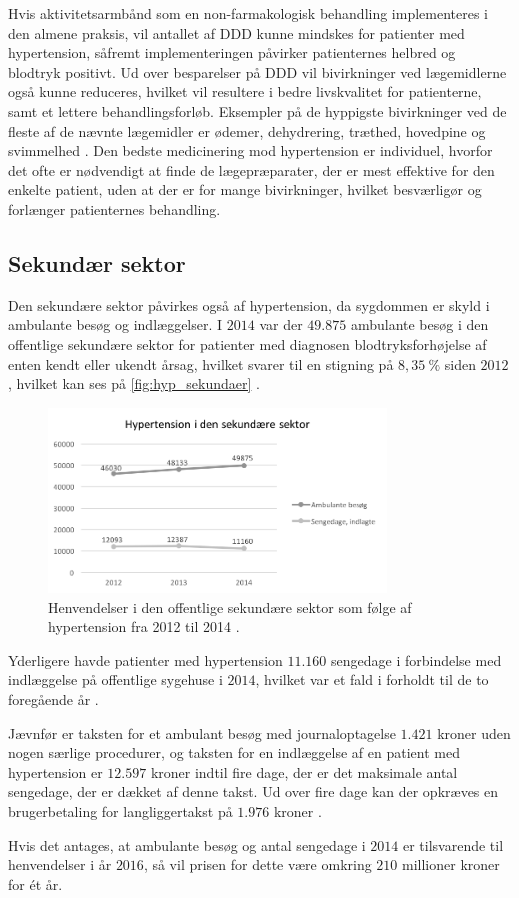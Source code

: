 Hvis aktivitetsarmbånd som en non-farmakologisk  behandling implementeres i den almene praksis, vil antallet af DDD kunne mindskes for patienter med hypertension, såfremt implementeringen påvirker patienternes helbred og blodtryk positivt. Ud over besparelser på DDD vil bivirkninger ved lægemidlerne også kunne reduceres, hvilket vil resultere i bedre livskvalitet for patienterne, samt et lettere behandlingsforløb. Eksempler på de hyppigste bivirkninger ved de fleste af de nævnte lægemidler er ødemer, dehydrering, træthed, hovedpine og svimmelhed \citep{olsen2015}. Den bedste medicinering mod hypertension er individuel, hvorfor det ofte er nødvendigt at finde de lægepræparater, der er mest effektive for den enkelte patient, uden at der er for mange bivirkninger, hvilket besværligør og forlænger patienternes behandling.

\subsection{Sekundær sektor}
Den sekundære sektor påvirkes også af hypertension, da sygdommen er skyld i ambulante besøg og indlæggelser. I $2014$ var der $49.875$ ambulante besøg i den offentlige sekundære sektor for patienter med diagnosen blodtryksforhøjelse af enten kendt eller ukendt årsag, hvilket svarer til en stigning på $8,35~\%$ siden $2012$, hvilket kan ses på \autoref{fig:hyp_sekundaer} \citep{sundhedsdatastyrelsen2016}. 

\begin{figure}[H]
\centering
\includegraphics[width=0.8\textwidth]{figures/hyp_sekundaer}
\caption{Henvendelser i den offentlige sekundære sektor som følge af hypertension fra 2012 til 2014 \citep{sundhedsdatastyrelsen2016}.}
\label{fig:hyp_sekundaer}
\end{figure}

\noindent
Yderligere havde patienter med hypertension $11.160$ sengedage i forbindelse med indlæggelse på offentlige sygehuse i $2014$, hvilket var et fald i forholdt til de to foregående år \citep{sundhedsdatastyrelsen2016}. 

Jævnfør \citeauthor{takstvejledning2016} er taksten for et ambulant besøg  med journaloptagelse $1.421$ kroner uden nogen særlige procedurer, og taksten for en indlæggelse af en patient med hypertension er $12.597$ kroner indtil fire dage, der er det maksimale antal sengedage, der er dækket af denne takst. Ud over fire dage kan der opkræves en brugerbetaling for langliggertakst på $1.976$ kroner \citep{takstvejledning2016}. 

Hvis det antages, at ambulante besøg og antal sengedage i $2014$ er tilsvarende til henvendelser i år $2016$, så vil prisen for dette være omkring $210$ millioner kroner for ét år. 